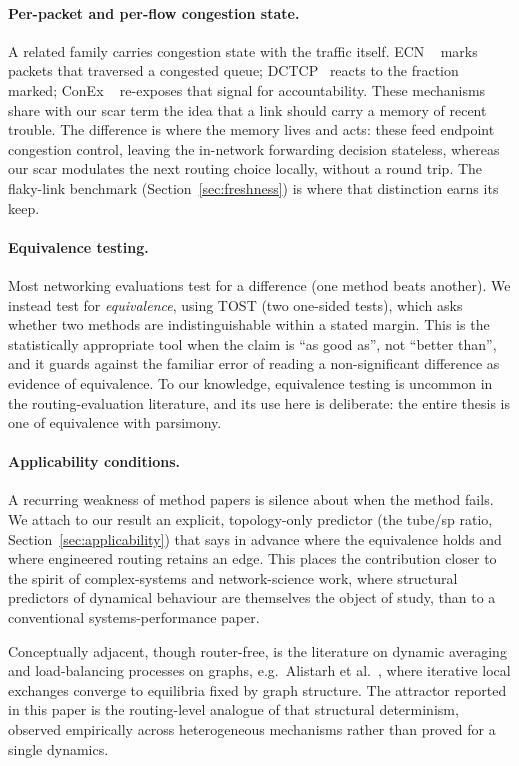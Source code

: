 \paragraph{Per-packet and per-flow congestion state.}
A related family carries congestion state with the traffic itself. ECN
~\cite{ramakrishnan2001ecn} marks packets that traversed a congested queue;
DCTCP~\cite{alizadeh2010dctcp} reacts to the fraction marked; ConEx
~\cite{briscoe2014conex} re-exposes that signal for accountability.
These mechanisms share with our scar term the idea that a link should carry a
memory of recent trouble. The difference is where the memory lives and acts:
these feed endpoint congestion control, leaving the in-network forwarding
decision stateless, whereas our scar modulates the next routing choice locally,
without a round trip. The flaky-link benchmark (Section~\ref{sec:freshness})
is where that distinction earns its keep.

\paragraph{Equivalence testing.}
Most networking evaluations test for a difference (one method beats another).
We instead test for \emph{equivalence}, using TOST (two one-sided
tests), which asks whether two methods are indistinguishable within a stated
margin. This is the statistically appropriate tool when the claim is ``as good
as'', not ``better than'', and it guards against the familiar error of reading a
non-significant difference as evidence of equivalence. To our knowledge,
equivalence testing is uncommon in the routing-evaluation literature, and its
use here is deliberate: the entire thesis is one of equivalence with parsimony.

\paragraph{Applicability conditions.}
A recurring weakness of method papers is silence about when the method fails. We
attach to our result an explicit, topology-only predictor (the tube/sp ratio,
Section~\ref{sec:applicability}) that says in advance where the equivalence
holds and where engineered routing retains an edge. This places the
contribution closer to the spirit of complex-systems and network-science work,
where structural predictors of dynamical behaviour are themselves the object of
study, than to a conventional systems-performance paper.


\medskip
Conceptually adjacent, though router-free, is the literature on dynamic
averaging and load-balancing processes on graphs, e.g.\ Alistarh et
al.~\cite{alistarh2022dynamic}, where iterative local exchanges converge
to equilibria fixed by graph structure. The attractor reported in this
paper is the routing-level analogue of that structural determinism,
observed empirically across heterogeneous mechanisms rather than proved
for a single dynamics.
